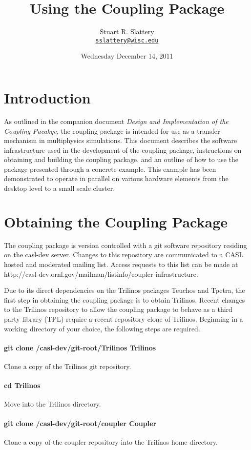 \documentclass[letterpaper]{article}
\author{Stuart R. Slattery
\\ \href{mailto:sslattery@wisc.edu}{\texttt{sslattery@wisc.edu}}
}
\date{Wednesday December 14, 2011}
\title{Using the Coupling Package}
\begin{document}
\maketitle

\section{Introduction}
As outlined in the companion document {\sl Design and Implementation of
the Coupling Pacakge}, the coupling package is intended for use as a
transfer mechanism in multiphysics simulations. This document
describes the software infrastructure used in the development of the
coupling package, instructions on obtaining and building the coupling
package, and an outline of how to use the package presented through a
concrete example. This example has been demonstrated to operate in
parallel on various hardware elements from the desktop level to a
small scale cluster.

\section{Obtaining the Coupling Package}
The coupling package is version controlled with a git software
repository residing on the casl-dev server. Changes to this repository
are communicated to a CASL hosted and moderated mailing list. Access
requests to this list can be made at
http://casl-dev.ornl.gov/mailman/listinfo/coupler-infrastructure.

Due to its direct dependencies on the Trilinos packages Teuchos and
Tpetra, the first step in obtaining the coupling package is to obtain
Trilinos. Recent changes to the Trilinos repository to allow the
coupling package to behave as a third party library (TPL) require a
recent repository clone of Trilinos. Beginning in a working directory
of your choice, the following steps are required.

\paragraph{git clone /casl-dev/git-root/Trilinos Trilinos}
Clone a copy of the Trilinos git repository.

\paragraph{cd Trilinos}
Move into the Trilinos directory.

\paragraph{git clone /casl-dev/git-root/coupler Coupler} 
Clone a copy of the coupler repository into the Trilinos home
directory.
\end{document}
